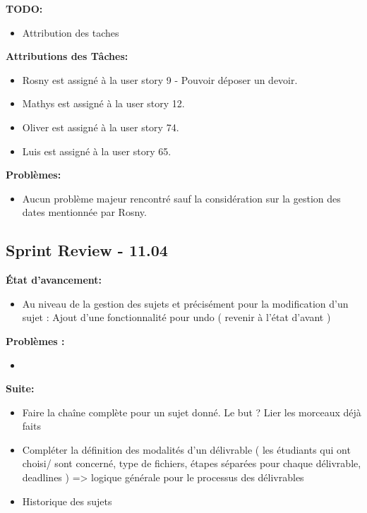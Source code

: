 \documentclass[11pt]{article}
\begin{document}
\textbf{TODO:}
\begin{itemize}
  \item Attribution des taches 
\end{itemize}

\textbf{Attributions des Tâches:}
\begin{itemize}
  \item Rosny est assigné à la user story 9 - Pouvoir déposer un devoir.
  \item Mathys est assigné à la user story 12.
  \item Oliver est assigné à la user story 74.
  \item Luis est assigné à la user story 65.
\end{itemize}

\textbf{Problèmes:}
\begin{itemize}
  \item Aucun problème majeur rencontré sauf la considération sur la gestion des dates mentionnée par Rosny.
\end{itemize}


\subsection*{{\color{navy}Sprint Review - 11.04}}
\textbf{État d'avancement:}
\begin{itemize}
  \item Au niveau de la gestion des sujets et précisément pour la modification d’un sujet : Ajout d’une fonctionnalité pour undo ( revenir à l’état d’avant )
\end{itemize}
\textbf{Problèmes :}
\begin{itemize}
  \item 
\end{itemize}
\textbf{Suite:}
\begin{itemize}
 \item Faire la chaîne complète pour un sujet donné. Le but ? Lier les morceaux déjà faits
 \item Compléter la définition des modalités d’un délivrable  ( les étudiants qui ont choisi/ sont concerné, type de fichiers, étapes séparées pour chaque délivrable, deadlines ) => logique générale pour le processus des délivrables 
 \item Historique des sujets

\end{itemize}
\end{document}
